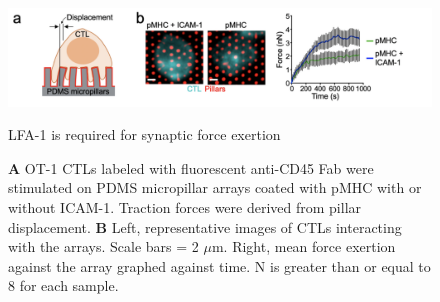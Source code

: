 \begin{figure}[htbp]
	\centering
	\includegraphics[width=\textwidth]{../figures/chapter3/ch3fig1pillarswithouticam.png}
	\caption{LFA-1 is required for synaptic force exertion}
	\caption*{\textbf{A} OT-1 CTLs labeled with fluorescent anti-CD45 Fab were stimulated on PDMS micropillar arrays coated with pMHC with or without ICAM-1. Traction forces were derived from pillar displacement.  \textbf{B} Left, representative images of CTLs interacting with the arrays. Scale bars = 2 $\mu$m.  Right, mean force exertion against the array graphed against time. N is greater than or equal to 8 for each sample.}
	\label{fig:ch3fig1pillarswithouticam}
\end{figure}

